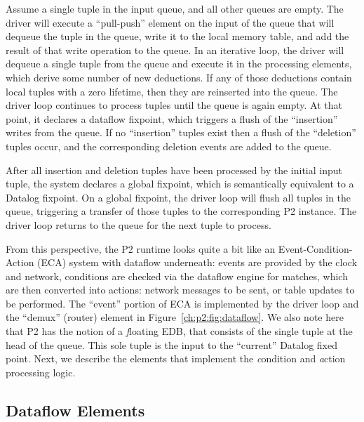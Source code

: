 Assume a single tuple in the  input queue, and all other queues are
empty.  The driver will execute a ``pull-push'' element on the input of the
 queue that will dequeue the tuple in the  queue, write it
to the local memory table, and add the result of that write operation to the
 queue.  In an iterative loop, the driver will dequeue a single tuple
from the  queue and execute it in the processing elements, which
derive some number of new deductions.  If any of those deductions contain local
tuples with a zero lifetime, then they are reinserted into the 
queue.  The driver loop continues to process  tuples until the
 queue is again empty.  At that point, it declares a dataflow
fixpoint, which triggers a flush of the ``insertion'' writes from the
 queue.  If no ``insertion'' tuples exist then a flush of the
``deletion'' tuples occur, and the corresponding deletion events are added to
the  queue.

After all insertion and deletion tuples have been processed by the initial
 input tuple, the system declares a global fixpoint, which is
semantically equivalent to a Datalog fixpoint.  On a global fixpoint, the
driver loop will flush all tuples in the  queue, triggering a
transfer of those tuples to the corresponding P2 instance.  The driver loop
returns to the  queue for the next tuple to process.

From this perspective, the P2 runtime looks quite a bit like an
Event-Condition-Action (ECA) system with dataflow underneath: events are
provided by the clock and network, conditions are checked via the dataflow
engine for matches, which are then converted into actions: network messages to
be sent, or table updates to be performed.  The ``event'' portion of ECA is
implemented by the driver loop and the ``demux'' (router) element in
Figure~\ref{ch:p2:fig:dataflow}.  We also note here that P2 has the notion of a
{\emph floating} EDB, that consists of the single tuple at the head of the 
queue.  This sole tuple is the input to the ``current'' Datalog fixed point.
Next, we describe the elements that implement the {\emph condition} and {\emph
action} processing logic.

\subsection{Dataflow Elements} 
\label{ch:p2:sec:dataflow_elements}

